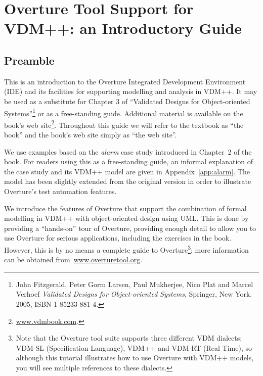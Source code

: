 \chapter{Overture Tool Support for VDM++: an Introductory Guide}\label{cha:toolbox}
\initexercise

\section*{Preamble}

This is an introduction to the Overture Integrated Development Environment (IDE) and its facilities for supporting modelling and analysis in VDM++. It may be used as a substitute for Chapter 3 of ``Validated Designs for Object-oriented Systems''\footnote{John Fitzgerald, Peter Gorm Larsen, Paul Mukherjee, Nico Plat and Marcel Verhoef \emph{Validated Designs for Object-oriented Systems}, Springer, New York. 2005, ISBN 1-85233-881-4.} or as a free-standing guide. Additional material is available on the book's web site\footnote{\url{www.vdmbook.com}.}. Throughout this guide we will refer to the textbook as ``the book'' and the book's web site simply as ``the web site''.

We use examples based on the \emph{alarm} case study introduced in Chapter~2 of the book. For readers using this as a free-standing guide, an informal explanation of the case study and its VDM++ model are given in Appendix~\ref{app:alarm}. The model has been slightly extended from the original version in order to illustrate Overture's test automation features.

We introduce the features of Overture that support the combination of formal modelling in VDM++ with object-oriented design using UML. This is done by providing a ``hands-on'' tour of Overture, providing enough detail to allow you to use Overture for serious applications, including the exercises in the book. However, this is by no means a complete guide to Overture\footnote{Note that the Overture tool suite supports three different VDM dialects; VDM-SL (Specification Language), VDM++ and VDM-RT (Real Time), so although this tutorial illustrates how to use Overture with VDM++ models, you will see multiple references to these dialects.}; more information can be obtained from~\url{www.overturetool.org}.
%

